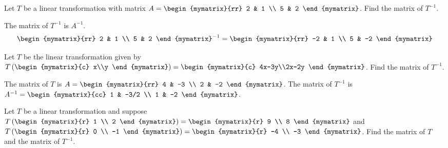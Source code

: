 \begin{ex}
  Let $T$ be a linear transformation with matrix
  $A = \begin{mymatrix}{rr}
    2 & 1 \\
    5 & 2
  \end{mymatrix}$. Find the matrix of $T^{-1}$.
  \begin{sol}
    The matrix of $T^{-1}$ is $A^{-1}$.
    \begin{equation*}
      \begin{mymatrix}{rr}
        2 & 1 \\
        5 & 2
      \end{mymatrix} ^{-1} =
      \begin{mymatrix}{rr}
        -2 & 1 \\
        5 & -2
      \end{mymatrix}
    \end{equation*}
  \end{sol}
\end{ex}

\begin{ex}
  Let $T$ be the linear transformation given by
  $T\paren{\begin{mymatrix}{c} x\\y \end{mymatrix}} =
  \begin{mymatrix}{c} 4x-3y\\2x-2y \end{mymatrix}$.  Find the matrix
  of $T^{-1}$.
  \begin{sol}
    The matrix of $T$ is
    $A = \begin{mymatrix}{rr}
    4 & -3 \\
    2 & -2
  \end{mymatrix}$. The matrix of $T^{-1}$ is $A^{-1} =
  \begin{mymatrix}{cc}
    1 & -3/2 \\
    1 & -2
  \end{mymatrix}$.
  \end{sol}
\end{ex}

\begin{ex} Let $T$ be a linear transformation and suppose $T \paren{\begin{mymatrix}{r}
      1 \\
      2
    \end{mymatrix}} = \begin{mymatrix}{r}
    9 \\
    8
  \end{mymatrix}$ and $T \paren{\begin{mymatrix}{r}
      0 \\
      -1
    \end{mymatrix}} = \begin{mymatrix}{r}
    -4 \\
    -3
  \end{mymatrix}$.
  Find the matrix of $T$ and the matrix of $T^{-1}$.
\end{ex}

